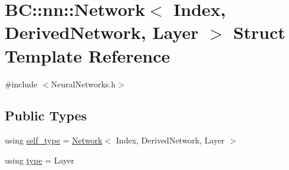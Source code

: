\hypertarget{structBC_1_1nn_1_1Network_3_01Index_00_01DerivedNetwork_00_01Layer_01_4}{}\section{BC\+:\+:nn\+:\+:Network$<$ Index, Derived\+Network, Layer $>$ Struct Template Reference}
\label{structBC_1_1nn_1_1Network_3_01Index_00_01DerivedNetwork_00_01Layer_01_4}


{\ttfamily \#include $<$Neural\+Networks.\+h$>$}

\subsection*{Public Types}
\begin{DoxyCompactItemize}
\item 
using \hyperlink{structBC_1_1nn_1_1Network_3_01Index_00_01DerivedNetwork_00_01Layer_01_4_a93f653e29b7526a9d12105376fe305e4}{self\+\_\+type} = \hyperlink{structBC_1_1nn_1_1Network}{Network}$<$ Index, Derived\+Network, Layer $>$
\item 
using \hyperlink{structBC_1_1nn_1_1Network_3_01Index_00_01DerivedNetwork_00_01Layer_01_4_ad4aa06ab69eeefd48555ca266da29512}{type} = Layer
\end{DoxyCompactItemize}
